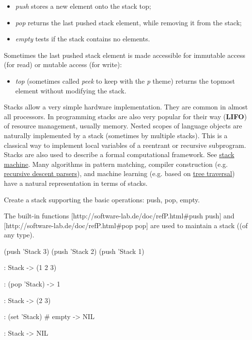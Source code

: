 \begin{itemize}
\item
  \emph{push} stores a new element onto the stack top;
\item
  \emph{pop} returns the last pushed stack element, while removing it
  from the stack;
\item
  \emph{empty} tests if the stack contains no elements.
\end{itemize}

Sometimes the last pushed stack element is made accessible for immutable
access (for read) or mutable access (for write):

\begin{itemize}
\item
  \emph{top} (sometimes called \emph{peek} to keep with the \emph{p}
  theme) returns the topmost element without modifying the stack.
\end{itemize}

Stacks allow a very simple hardware implementation. They are common in
almost all processors. In programming stacks are also very popular for
their way (\textbf{LIFO}) of resource management, usually memory. Nested
scopes of language objects are naturally implemented by a stack
(sometimes by multiple stacks). This is a classical way to implement
local variables of a reentrant or recursive subprogram. Stacks are also
used to describe a formal computational framework. See
\href{http://en.wikipedia.org/wiki/Stack\_automaton}{stack machine}.
Many algorithms in pattern matching, compiler construction (e.g.
\href{http://en.wikipedia.org/wiki/Recursive\_descent}{recursive descent
parsers}), and machine learning (e.g. based on
\href{http://en.wikipedia.org/wiki/Tree\_traversal}{tree traversal})
have a natural representation in terms of stacks.

Create a stack supporting the basic operations: push, pop, empty.

\begin{wideverbatim}

The built-in functions [http://software-lab.de/doc/refP.html#push push] and
[http://software-lab.de/doc/refP.html#pop pop] are used to maintain a
stack ((of any type).

(push 'Stack 3)
(push 'Stack 2)
(push 'Stack 1)

: Stack
-> (1 2 3)

: (pop 'Stack)
-> 1

: Stack
-> (2 3)

: (set 'Stack)  # empty
-> NIL

: Stack
-> NIL

\end{wideverbatim}

